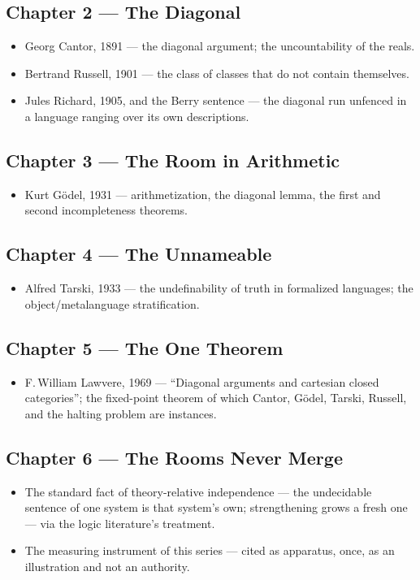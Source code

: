\subsection*{Chapter 2 --- The Diagonal}
\begin{itemize}
\item Georg Cantor, 1891 --- the diagonal argument; the uncountability of
the reals.
\item Bertrand Russell, 1901 --- the class of classes that do not contain
themselves.
\item Jules Richard, 1905, and the Berry sentence --- the diagonal run
unfenced in a language ranging over its own descriptions.
\end{itemize}

\subsection*{Chapter 3 --- The Room in Arithmetic}
\begin{itemize}
\item Kurt G\"odel, 1931 --- arithmetization, the diagonal lemma, the
first and second incompleteness theorems.
\end{itemize}

\subsection*{Chapter 4 --- The Unnameable}
\begin{itemize}
\item Alfred Tarski, 1933 --- the undefinability of truth in formalized
languages; the object/metalanguage stratification.
\end{itemize}

\subsection*{Chapter 5 --- The One Theorem}
\begin{itemize}
\item F.\,William Lawvere, 1969 --- ``Diagonal arguments and cartesian
closed categories''; the fixed-point theorem of which Cantor, G\"odel,
Tarski, Russell, and the halting problem are instances.
\end{itemize}

\subsection*{Chapter 6 --- The Rooms Never Merge}
\begin{itemize}
\item The standard fact of theory-relative independence --- the
undecidable sentence of one system is that system's own; strengthening
grows a fresh one --- via the logic literature's treatment.
\item The measuring instrument of this series --- cited as apparatus,
once, as an illustration and not an authority.
\end{itemize}

